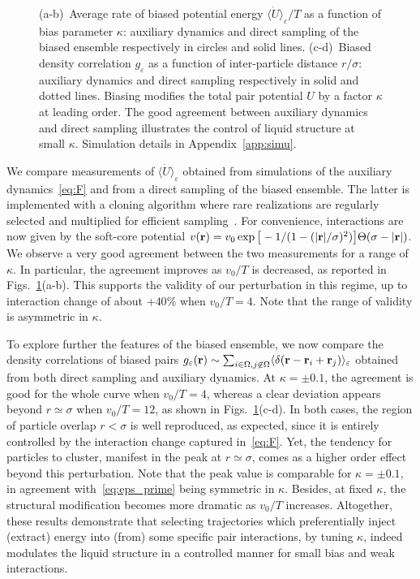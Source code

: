 \documentclass[pre, superscriptaddress, twocolumn,pre]{revtex4-1}
\begin{document}
\begin{figure}
	\caption{\label{fig:energybias}
		(a-b)~Average rate of biased potential energy $\langle\dot U\rangle_\varepsilon/T$ as a function of bias parameter $\kappa$: auxiliary dynamics and direct sampling of the biased ensemble respectively in circles and solid lines.
		(c-d)~Biased density correlation $g_\varepsilon$ as a function of inter-particle distance $r/\sigma$: auxiliary dynamics and direct sampling respectively in solid and dotted lines.
		Biasing modifies the total pair potential $U$ by a factor $\kappa$ at leading order. The good agreement between auxiliary dynamics and direct sampling illustrates the control of liquid structure at small $\kappa$.
		Simulation details in Appendix~\ref{app:simu}.
}
\end{figure}


We compare measurements of $\langle\dot U\rangle_\varepsilon$ obtained from simulations of the auxiliary dynamics~\eqref{eq:F} and from a direct sampling of the biased ensemble. The latter is implemented with a cloning algorithm where rare realizations are regularly selected and multiplied for efficient sampling~\cite{Giadina2006, tailleur2007probing, Hurtado2009, Nemoto2016, Ray2018, Klymko2018, Brewer2018}. For convenience, interactions are now given by the soft-core potential $v({\bf r}) = v_0\exp\big[-1 / (1 - (|{\bf r}|/\sigma)^2)\big]\Theta(\sigma-|{\bf r}|)$. We observe a very good agreement between the two measurements for a range of $\kappa$. In particular, the agreement improves as $v_0/T$ is decreased, as reported in Figs.~\ref{fig:energybias}(a-b). This supports the validity of our perturbation in this regime, up to interaction change of about $+40\%$ when $v_0/T=4$. Note that the range of validity is asymmetric in $\kappa$. 


To explore further the features of the biased ensemble, we now compare the density correlations of biased pairs $g_\varepsilon({\bf r})\sim \sum_{i\in\Omega,j\not\in\Omega}\langle \delta({\bf r}-{\bf r}_i+{\bf r}_j)\rangle_\varepsilon$ obtained from both direct sampling and auxiliary dynamics. At $\kappa=\pm0.1$, the agreement is good for the whole curve when $v_0/T=4$, whereas a clear deviation appears beyond $r\simeq\sigma$ when $v_0/T=12$, as shown in Figs.~\ref{fig:energybias}(c-d). In both cases, the region of particle overlap $r<\sigma$ is well reproduced, as expected, since it is entirely controlled by the interaction change captured in~\eqref{eq:F}. Yet, the tendency for particles to cluster, manifest in the peak at $r\simeq\sigma$, comes as a higher order effect beyond this perturbation. Note that the peak value is comparable for $\kappa=\pm0.1$, in agreement with~\eqref{eq:eps_prime} being symmetric in $\kappa$. Besides, at fixed $\kappa$, the structural modification becomes more dramatic as $v_0/T$ increases. Altogether, these results demonstrate that selecting trajectories which preferentially inject (extract) energy into (from) some specific pair interactions, by tuning $\kappa$, indeed modulates the liquid structure in a controlled manner for small bias and weak interactions.
\end{document}
